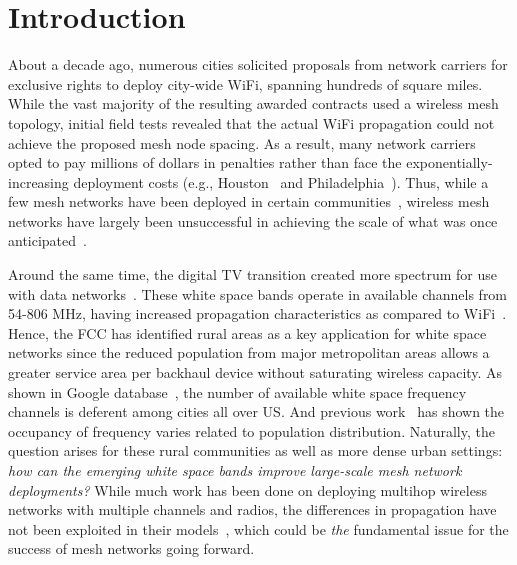 \section{Introduction}
\label{sec:introduction}



About a decade ago, numerous cities solicited proposals from
network carriers for exclusive rights to deploy city-wide WiFi,
spanning hundreds of square miles.  
While the vast majority of the resulting awarded contracts used
a wireless mesh topology, initial field tests revealed that the 
actual WiFi propagation could not achieve the proposed mesh node
spacing. As a result, many network carriers opted to pay millions of 
dollars in penalties rather than face the exponentially-increasing
deployment costs (e.g., Houston~\cite{cnet_aug07} and 
Philadelphia~\cite{arstechnica_may08}). Thus, while a few mesh 
networks have been deployed in certain communities~\cite{CRSK06,google_imc08},
wireless mesh networks have largely been unsuccessful in achieving 
the scale of what was once anticipated~\cite{taps}.


Around the same time, the digital TV transition created more
spectrum for use with data networks~\cite{fccwhitespace}. These white 
space bands operate in available channels from 54-806 MHz, having
increased propagation characteristics as compared to 
WiFi~\cite{balanis2012antenna}. Hence, the FCC has identified rural
areas as a key application for white space networks since the reduced
population from major metropolitan areas allows a greater service area
per backhaul device without saturating wireless capacity. 
As shown in Google database~\cite{googledatabase}, the number of available white
space frequency channels is deferent among cities all over US. 
And previous work~\cite{pcuiwinmee} has shown the occupancy of 
frequency varies related to population distribution.
Naturally, 
the question arises for these rural communities as well as more dense 
urban settings: {\it how can the emerging white space bands improve 
large-scale mesh network deployments?}  While much work has been done 
on deploying multihop wireless networks with multiple channels and 
radios, the differences in propagation have not been exploited in their 
models~\cite{tang2005interference, si2010overview,long2013fair,doraghinejad2014channel}, 
which could be {\it the} fundamental issue for the success of mesh 
networks going forward.

